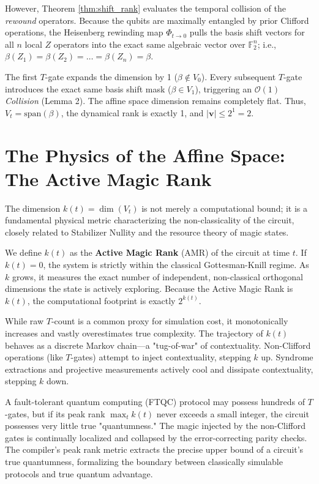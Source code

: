 \documentclass[aps,prx,reprint,superscriptaddress,nofootinbib]{revtex4-2}
\theoremstyle{definition}
\begin{document}
However, Theorem \ref{thm:shift_rank} evaluates the temporal collision of the \textit{rewound} operators. Because the qubits are maximally entangled by prior Clifford operations, the Heisenberg rewinding map $\Phi_{t \to 0}$ pulls the basis shift vectors for all $n$ local $Z$ operators into the exact same algebraic vector over $\mathbb{F}_2^n$; i.e., $\beta(Z_1) = \beta(Z_2) = \dots = \beta(Z_n) = \beta$.

The first $T$-gate expands the dimension by 1 ($\beta \notin V_0$). Every subsequent $T$-gate introduces the exact same basis shift mask ($\beta \in V_1$), triggering an $\mathcal{O}(1)$ \textit{Collision} (Lemma 2). The affine space dimension remains completely flat. Thus, $V_t = \text{span}(\beta)$, the dynamical rank is exactly 1, and $|\mathbf{v}| \le 2^1 = 2$.

\section{The Physics of the Affine Space: The Active Magic Rank}
\label{sec:physics}

The dimension $k(t) = \dim(V_t)$ is not merely a computational bound; it is a fundamental physical metric characterizing the non-classicality of the circuit, closely related to Stabilizer Nullity \cite{beverland2020} and the resource theory of magic states.

We define $k(t)$ as the \textbf{Active Magic Rank} (AMR) of the circuit at time $t$. If $k(t)=0$, the system is strictly within the classical Gottesman-Knill regime. As $k$ grows, it measures the exact number of independent, non-classical orthogonal dimensions the state is actively exploring. Because the Active Magic Rank is $k(t)$, the computational footprint is exactly $2^{k(t)}$.

While raw $T$-count is a common proxy for simulation cost, it monotonically increases and vastly overestimates true complexity. The trajectory of $k(t)$ behaves as a discrete Markov chain—a "tug-of-war" of contextuality. Non-Clifford operations (like $T$-gates) attempt to inject contextuality, stepping $k$ up. Syndrome extractions and projective measurements actively cool and dissipate contextuality, stepping $k$ down.

A fault-tolerant quantum computing (FTQC) protocol may possess hundreds of $T$-gates, but if its peak rank $\max_t k(t)$ never exceeds a small integer, the circuit possesses very little true "quantumness." The magic injected by the non-Clifford gates is continually localized and collapsed by the error-correcting parity checks. The compiler's peak rank metric extracts the precise upper bound of a circuit's true quantumness, formalizing the boundary between classically simulable protocols and true quantum advantage.
\end{document}
